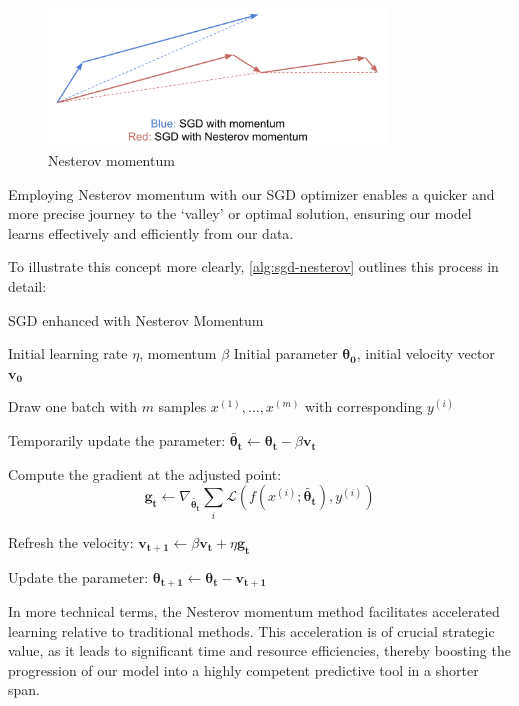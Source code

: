 \begin{figure}[htp]
    \centering
    \includegraphics[width=0.8\textwidth]{./figures/nesterov.png}
    \caption{Nesterov momentum}
    \label{fig:nesterov}
\end{figure}

Employing Nesterov momentum with our SGD optimizer enables a quicker and more precise journey to the `valley' or optimal solution, ensuring our model learns effectively and efficiently from our data.

To illustrate this concept more clearly, \autoref{alg:sgd-nesterov} outlines this process in detail:
\begin{algorithm}[htp]
\caption{SGD enhanced with Nesterov Momentum}\label{alg:sgd-nesterov}
\begin{algorithmic}[1]
\Require Initial learning rate \(\eta\), momentum \(\beta\)
\Require Initial parameter \(\mathbf{\theta_{0}}\), initial velocity vector \(\mathbf{v_{0}}\)
\item Draw one batch with \(m\) samples \({ x^{(1)}, \ldots , x^{(m)} }\) with corresponding \(y^{(i)}\)
\item Temporarily update the parameter: \(\tilde{\mathbf{\theta_{t}}} \leftarrow \mathbf{\theta_{t}} - \beta \mathbf{v_{t}}\)
\item Compute the gradient at the adjusted point:
\[
\mathbf{g_{t}} \leftarrow \nabla_{\tilde{\mathbf{\theta_{t}}}}\sum_{i}\mathcal{L}(f(x^{(i)}; \tilde{\mathbf{\theta_{t}}}), y^{(i)})
\]
\item Refresh the velocity: \(\mathbf{v_{t+1}} \leftarrow \beta\mathbf{v_{t}} + \eta \mathbf{g_{t}}\)
\item Update the parameter: \(\mathbf{\theta_{t + 1}} \leftarrow \mathbf{\theta_{t}} - \mathbf{v_{t + 1}}\)
\EndWhile
\end{algorithmic}
\end{algorithm}

In more technical terms, the Nesterov momentum method facilitates accelerated learning relative to traditional methods. This acceleration is of crucial strategic value, as it leads to significant time and resource efficiencies, thereby boosting the progression of our model into a highly competent predictive tool in a shorter span.

